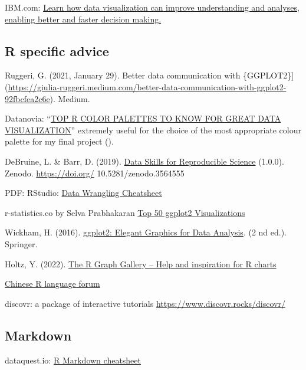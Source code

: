 \documentclass[
]{book}
\begin{document}
IBM.com: \href{https://ibm.com/cloud/learn/data-visualization}{Learn how data visualization can improve understanding and analyses, enabling better and faster decision making.}

\hypertarget{r-specific-advice}{%
\subsection{R specific advice}\label{r-specific-advice}}

Ruggeri, G. (2021, January 29). Better data communication with \{GGPLOT2\}{]}(\url{https://giulia-ruggeri.medium.com/better-data-communication-with-ggplot2-92fbcfea2c6e}). Medium.

Datanovia: ``\href{https://www.datanovia.com/en/blog/top-r-color-palettes-to-know-for-great-data-\%20visualization/}{TOP R COLOR PALETTES TO KNOW FOR GREAT DATA VISUALIZATION}'' extremely useful for the choice of the most appropriate colour palette for my final project ().

DeBruine, L. \& Barr, D. (2019). \href{https://psyteachr.github.io/msc-data-skills/}{Data Skills for Reproducible Science} (1.0.0). Zenodo. \url{https://doi.org/} 10.5281/zenodo.3564555

PDF: RStudio: \href{https://www.rstudio.com/wp-content/uploads/2015/02/data-wrangling-cheatsheet.pdf}{Data Wrangling Cheatsheet}

r-statistics.co by Selva Prabhakaran \href{http://r-statistics.co/Top50-Ggplot2-Visualizations-MasterList-R-Code.html}{Top 50 ggplot2 Visualizations}

Wickham, H. (2016). \href{https://ggplot2-book.org/}{ggplot2: Elegant Graphics for Data Analysis}. (2 nd ed.). Springer.

Holtz, Y. (2022). \href{https://r-graph-gallery.com}{The R Graph Gallery -- Help and inspiration for R charts}

\href{https://bbs.pinggu.org/forum-69-1.html}{Chinese R language forum}

discovr: a package of interactive tutorials \href{discovr.rocks/discovr/}{https://www.discovr.rocks/discovr/}

\hypertarget{markdown}{%
\subsection{Markdown}\label{markdown}}

dataquest.io: \href{https://www.dataquest.io/blog/r-markdown-guide-cheatsheet/}{R Markdown cheatsheet}
\end{document}
